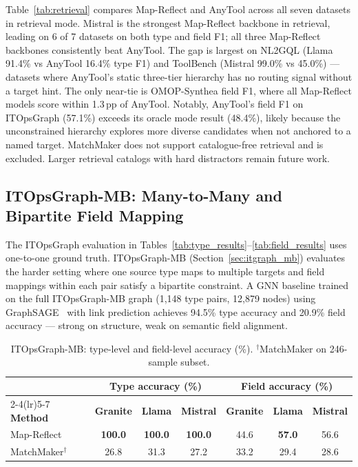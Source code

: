 \documentclass[sigconf, nonacm]{acmart}
\begin{document}
Table~\ref{tab:retrieval} compares Map-Reflect and AnyTool across all seven datasets in retrieval mode. Mistral is the strongest Map-Reflect backbone in retrieval, leading on 6 of 7 datasets on both type and field F1; all three Map-Reflect backbones consistently beat AnyTool. The gap is largest on NL2GQL (Llama 91.4\% vs AnyTool 16.4\% type F1) and ToolBench (Mistral 99.0\% vs 45.0\%) --- datasets where AnyTool's static three-tier hierarchy has no routing signal without a target hint. The only near-tie is OMOP-Synthea field F1, where all Map-Reflect models score within 1.3\,pp of AnyTool. Notably, AnyTool's field F1 on ITOpsGraph (57.1\%) exceeds its oracle mode result (48.4\%), likely because the unconstrained hierarchy explores more diverse candidates when not anchored to a named target. MatchMaker does not support catalogue-free retrieval and is excluded. Larger retrieval catalogs with hard distractors remain future work.

\subsection{ITOpsGraph-MB: Many-to-Many and Bipartite Field Mapping}\label{sec:m2m}

The ITOpsGraph evaluation in Tables~\ref{tab:type_results}--\ref{tab:field_results} uses one-to-one ground truth. ITOpsGraph-MB (Section~\ref{sec:itgraph_mb}) evaluates the harder setting where one source type maps to multiple targets and field mappings within each pair satisfy a bipartite constraint. A GNN baseline trained on the full ITOpsGraph-MB graph (1,148 type pairs, 12,879 nodes) using GraphSAGE~\cite{hamilton2017inductive} with link prediction achieves 94.5\% type accuracy and 20.9\% field accuracy — strong on structure, weak on semantic field alignment.

\begin{table}[htbp]
\centering
\small
\caption{ITOpsGraph-MB: type-level and field-level accuracy (\%). $^\dagger$MatchMaker on 246-sample subset.}
\label{tab:itgraph_mb_type}
\setlength{\tabcolsep}{6pt}
\begin{tabular}{l ccc ccc}
\toprule
& \multicolumn{3}{c}{\textbf{Type accuracy (\%)}} & \multicolumn{3}{c}{\textbf{Field accuracy (\%)}} \\
\cmidrule(lr){2-4}\cmidrule(lr){5-7}
\textbf{Method} & \textbf{Granite} & \textbf{Llama} & \textbf{Mistral} & \textbf{Granite} & \textbf{Llama} & \textbf{Mistral} \\
\midrule
Map-Reflect          & \textbf{100.0} & \textbf{100.0} & \textbf{100.0} & 44.6 & \textbf{57.0} & 56.6 \\
MatchMaker$^\dagger$ & 26.8  & 31.3  & 27.2  & 33.2 & 29.4  & 28.6 \\
\bottomrule
\end{tabular}
\end{table}
\end{document}
